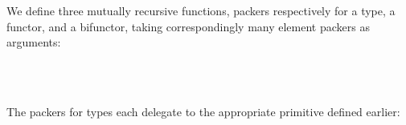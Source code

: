 \documentclass[fleqn,runningheads]{llncs}
\begin{document}
\begin{AgdaAlign}
We define three mutually recursive functions, packers respectively for a type, a functor, and a bifunctor, taking correspondingly many element packers as arguments:
\begin{code}%
%
\>[2]%
\>[9]\AgdaSymbol{:}\AgdaSpace{}%
\AgdaSymbol{(}\AgdaSpace{}%
\AgdaSymbol{:}\AgdaSpace{}%
\AgdaSymbol{)}%
\>[28]%
\>[53]\AgdaSpace{}%
\AgdaOperator{\AgdaFunction{[[}}\AgdaSpace{}%
\AgdaSpace{}%
\AgdaOperator{\AgdaFunction{]]T}}\<%
\\
%
\>[2]%
\>[9]\AgdaSymbol{:}\AgdaSpace{}%
\AgdaSymbol{(}\AgdaSpace{}%
\AgdaSymbol{:}\AgdaSpace{}%
\AgdaSymbol{)}%
\>[28]\AgdaSpace{}%
\AgdaSpace{}%
\AgdaSpace{}%
%
\>[53]\AgdaSpace{}%
\AgdaSymbol{(}\AgdaOperator{\AgdaFunction{[[}}\AgdaSpace{}%
\AgdaSpace{}%
\AgdaOperator{\AgdaFunction{]]F}}\AgdaSpace{}%
\AgdaSymbol{)}\<%
\\
%
\>[2]%
\>[9]\AgdaSymbol{:}\AgdaSpace{}%
\AgdaSymbol{(}\AgdaSpace{}%
\AgdaSymbol{:}\AgdaSpace{}%
\AgdaSymbol{)}%
\>[28]\AgdaSpace{}%
\AgdaSpace{}%
\AgdaSpace{}%
\AgdaSpace{}%
\AgdaSpace{}%
\AgdaSpace{}%
%
\>[53]\AgdaSpace{}%
\AgdaSymbol{(}\AgdaOperator{\AgdaFunction{[[}}\AgdaSpace{}%
\AgdaSpace{}%
\AgdaOperator{\AgdaFunction{]]B}}\AgdaSpace{}%
\AgdaSpace{}%
\AgdaSymbol{)}\<%
\end{code}
The packers for types each delegate to the appropriate primitive defined earlier:
\begin{code}%
%
\>[2]\AgdaSpace{}%
\AgdaSpace{}%
%
\>[23]\AgdaSymbol{=}\AgdaSpace{}%
\AgdaSpace{}%
\<%
\\
%
\>[2]\AgdaSpace{}%
\AgdaSpace{}%
%
\>[23]\AgdaSymbol{=}\AgdaSpace{}%
\AgdaSpace{}%
\<%
\\
%
\>[2]\AgdaSpace{}%
\AgdaSpace{}%
%
\>[23]\AgdaSymbol{=}\AgdaSpace{}%
\AgdaSpace{}%

\end{code}
\end{AgdaAlign}
\end{document}
